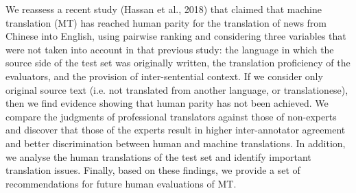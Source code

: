 We reassess a recent study (Hassan et al., 2018) that claimed that machine translation (MT) has reached human parity for the translation of news from Chinese into English, using pairwise ranking and considering three variables that were not taken into account in that previous study: the language in which the source side of the test set was originally written, the translation proficiency of the evaluators, and the provision of inter-sentential context. If we consider only original source text (i.e. not translated from another language, or translationese), then we find evidence showing that human parity has not been achieved. We compare the judgments of professional translators against those of non-experts and discover that those of the experts result in higher inter-annotator agreement and better discrimination between human and machine translations. In addition, we analyse the human translations of the test set and identify important translation issues. Finally, based on these findings, we provide a set of recommendations for future human evaluations of MT.

